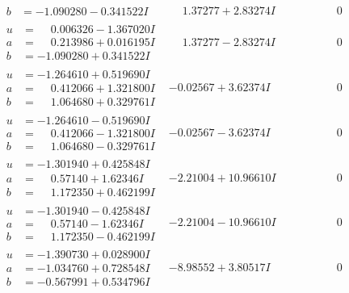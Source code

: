 \documentclass[1p]{elsarticle_modified}
\theoremstyle{definition}
\begin{document}
$$\begin{array}{c|c|c}
\begin{aligned}
b &= -1.090280 - 0.341522 I\end{aligned}
 & \phantom{-}1.37277 + 2.83274 I & \phantom{-0.000000 } 0 \\ \hline\begin{aligned}
u &= \phantom{-}0.006326 - 1.367020 I \\
a &= \phantom{-}0.213986 + 0.016195 I \\
b &= -1.090280 + 0.341522 I\end{aligned}
 & \phantom{-}1.37277 - 2.83274 I & \phantom{-0.000000 } 0 \\ \hline\begin{aligned}
u &= -1.264610 + 0.519690 I \\
a &= \phantom{-}0.412066 + 1.321800 I \\
b &= \phantom{-}1.064680 + 0.329761 I\end{aligned}
 & -0.02567 + 3.62374 I & \phantom{-0.000000 } 0 \\ \hline\begin{aligned}
u &= -1.264610 - 0.519690 I \\
a &= \phantom{-}0.412066 - 1.321800 I \\
b &= \phantom{-}1.064680 - 0.329761 I\end{aligned}
 & -0.02567 - 3.62374 I & \phantom{-0.000000 } 0 \\ \hline\begin{aligned}
u &= -1.301940 + 0.425848 I \\
a &= \phantom{-}0.57140 + 1.62346 I \\
b &= \phantom{-}1.172350 + 0.462199 I\end{aligned}
 & -2.21004 + 10.96610 I & \phantom{-0.000000 } 0 \\ \hline\begin{aligned}
u &= -1.301940 - 0.425848 I \\
a &= \phantom{-}0.57140 - 1.62346 I \\
b &= \phantom{-}1.172350 - 0.462199 I\end{aligned}
 & -2.21004 - 10.96610 I & \phantom{-0.000000 } 0 \\ \hline\begin{aligned}
u &= -1.390730 + 0.028900 I \\
a &= -1.034760 + 0.728548 I \\
b &= -0.567991 + 0.534796 I\end{aligned}
 & -8.98552 + 3.80517 I & \phantom{-0.000000 } 0 \\ \hline\begin{aligned}

\end{aligned}
\end{array}$$
\end{document}
